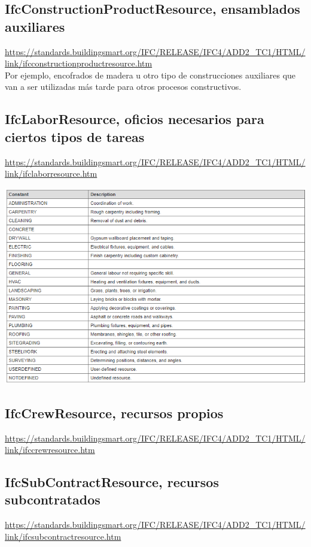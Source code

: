 \documentclass[spanish,12pt,a4paper,final,oneside]{book}
\begin{document}
\subsection{IfcConstructionProductResource, ensamblados auxiliares}
\url{https://standards.buildingsmart.org/IFC/RELEASE/IFC4/ADD2_TC1/HTML/link/ifcconstructionproductresource.htm}
\\Por ejemplo, encofrados de madera u otro tipo de construcciones auxiliares que van a ser utilizadas más tarde para otros procesos constructivos. 

\subsection{IfcLaborResource, oficios necesarios para ciertos tipos de tareas}
\url{https://standards.buildingsmart.org/IFC/RELEASE/IFC4/ADD2_TC1/HTML/link/ifclaborresource.htm}

\includegraphics[width=\textwidth]{Definicion de IfcLaborResourceTypeEnum}


\subsection{IfcCrewResource, recursos propios}
\url{https://standards.buildingsmart.org/IFC/RELEASE/IFC4/ADD2_TC1/HTML/link/ifccrewresource.htm}

\subsection{IfcSubContractResource, recursos subcontratados}
\url{https://standards.buildingsmart.org/IFC/RELEASE/IFC4/ADD2_TC1/HTML/link/ifcsubcontractresource.htm}
\end{document}
